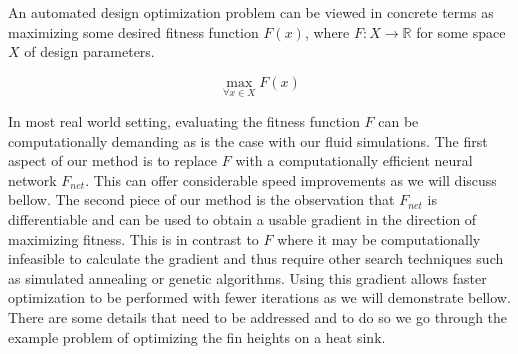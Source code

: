 \documentclass{article} %
\begin{document}
An automated design optimization problem can be viewed in concrete terms as maximizing some desired fitness function $F(x)$, where $F:X \rightarrow \mathbb{R}$ for some space $X$ of design parameters.

\begin{equation}
  \max_{\forall x \in X} F(x)
\end{equation}

In most real world setting, evaluating the fitness function $F$ can be computationally demanding as is the case with our fluid simulations. The first aspect of our method is to replace $F$ with a computationally efficient neural network $F_{net}$. This can offer considerable speed improvements as we will discuss bellow. The second piece of our method is the observation that $F_{net}$ is differentiable and can be used to obtain a usable gradient in the direction of maximizing fitness. This is in contrast to $F$ where it may be computationally infeasible to calculate the gradient and thus require other search techniques such as simulated annealing or genetic algorithms. Using this gradient allows faster optimization to be performed with fewer iterations as we will demonstrate bellow. There are some details that need to be addressed and to do so we go through the example problem of optimizing the fin heights on a heat sink.
\end{document}
